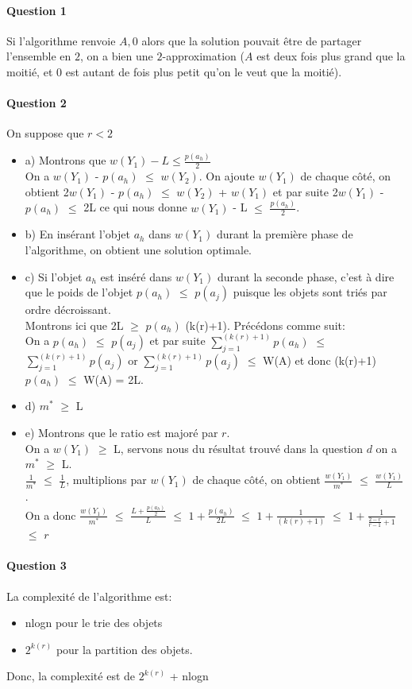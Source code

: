 \paragraph{Question 1}

Si l'algorithme renvoie $A, 0$ alors que la solution pouvait être de
partager l'ensemble en $2$, on a bien une $2$-approximation ($A$ est
deux fois plus grand que la moitié, et $0$ est autant de fois plus
petit qu'on le veut que la moitié).

\paragraph{Question 2}
On suppose que $r < 2$
\begin{itemize}
\item a) Montrons que $w(Y_{1}) - L \leqslant \frac{p(a_{h})}{2}$\\
On a $w(Y_{1})$ - $p(a_{h})$ $\leqslant$ $w(Y_{2})$. On ajoute $w(Y_{1})$ de chaque côté, on obtient 2$w(Y_{1})$ - $p(a_{h})$ $\leqslant$ $w(Y_{2})$ + $w(Y_{1})$ et par suite 2$w(Y_{1})$ - $p(a_{h})$ $\leqslant$ 2L ce qui nous donne $w(Y_{1})$ - L $\leqslant$ $\frac{p(a_{h})}{2}$.
\item b) En insérant l'objet $a_{h}$ dans $w(Y_{1})$ durant la première phase de l'algorithme, on obtient une solution optimale. 
\item c) Si l'objet $a_{h}$ est inséré dans $w(Y_{1})$ durant la seconde phase, c'est à dire que le poids de l'objet  $p(a_{h})$ $\leqslant$ $p(a_{j})$ puisque les objets sont triés par ordre décroissant.\\
Montrons ici que 2L $\geqslant$ $p(a_{h})$ (k(r)+1).
Précédons comme suit:\\
On a $p(a_{h})$ $\leqslant$ $p(a_{j})$ et par suite $\sum_{j=1}^{(k(r)+1)} p(a_{h})$ $\leqslant$ $\sum_{j=1}^{(k(r)+1)} p(a_{j})$ or $\sum_{j=1}^{(k(r)+1)} p(a_{j})$ $\leqslant$ W(A) et donc (k(r)+1)$p(a_{h})$ $\leqslant$ W(A) = 2L. 
\item d) $m^{*}$ $\geqslant$ L
\item e) Montrons que le ratio est majoré par $r$.\\
On a $w(Y_{1})$ $\geqslant$ L, servons nous du résultat trouvé dans la question $d$ on a $m^{*}$ $\geqslant$ L.\\
$\frac{1}{m^{*}}$ $\leqslant$ $\frac{1}{L}$, multiplions par $w(Y_{1})$ de chaque côté, on obtient $\frac{w(Y_{1})}{m^{*}}$ $\leqslant$ $\frac{w(Y_{1})}{L}$.\\
On a donc $\frac{w(Y_{1})}{m^{*}}$ $\leqslant$ $\frac {L + \frac {p(a_{h})}{2}}{L}$ $\leqslant$ $1 + \frac{p(a_{h})}{2L}$ $\leqslant$ $1 + \frac{1}{(k(r)+1)}$ $\leqslant$ $1 + \frac{1}{\frac{2-r}{r-1}+1}$ $\leqslant$ $r$
\end{itemize}
\paragraph{Question 3}
La complexité de l'algorithme est: 
\begin{itemize}
\item nlogn pour le trie des objets 
\item $2^{k(r)}$ pour la partition des objets.
\end{itemize}
Donc, la complexité est de $2^{k(r)}$ +  nlogn

